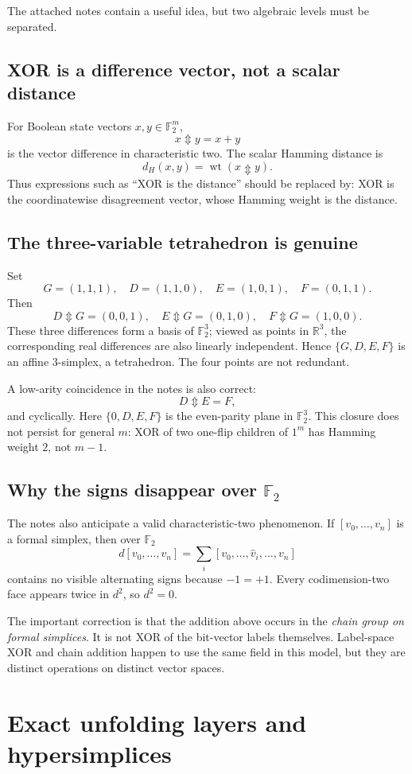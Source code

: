 \documentclass[11pt]{article}
\newcommand{\Ftwo}{\mathbb F_2}
\newcommand{\wt}{\operatorname{wt}}
\newcommand{\Updown}{\mathbin{\Updownarrow}}
\begin{document}
The attached notes contain a useful idea, but two algebraic levels must be separated.

\subsection{XOR is a difference vector, not a scalar distance}
For Boolean state vectors $x,y\in\Ftwo^m$,
\[
x\Updown y=x+y
\]
is the vector difference in characteristic two.  The scalar Hamming distance is
\[
d_H(x,y)=\wt(x\Updown y).
\]
Thus expressions such as ``XOR is the distance'' should be replaced by: XOR is the coordinatewise disagreement vector, whose Hamming weight is the distance.

\subsection{The three-variable tetrahedron is genuine}
Set
\[
G=(1,1,1),\quad D=(1,1,0),\quad E=(1,0,1),\quad F=(0,1,1).
\]
Then
\[
D\Updown G=(0,0,1),\quad E\Updown G=(0,1,0),\quad F\Updown G=(1,0,0).
\]
These three differences form a basis of $\Ftwo^3$; viewed as points in $\mathbb R^3$, the corresponding real differences are also linearly independent.  Hence $\{G,D,E,F\}$ is an affine $3$-simplex, a tetrahedron.  The four points are not redundant.

A low-arity coincidence in the notes is also correct:
\[
D\Updown E=F,
\]
and cyclically.  Here $\{0,D,E,F\}$ is the even-parity plane in $\Ftwo^3$.  This closure does not persist for general $m$: XOR of two one-flip children of $1^m$ has Hamming weight $2$, not $m-1$.

\subsection{Why the signs disappear over $\Ftwo$}
The notes also anticipate a valid characteristic-two phenomenon.  If $[v_0,\dots,v_n]$ is a formal simplex, then over $\Ftwo$
\[
d[v_0,\dots,v_n]
=\sum_i[v_0,\dots,\widehat v_i,\dots,v_n]
\]
contains no visible alternating signs because $-1=+1$.  Every codimension-two face appears twice in $d^2$, so $d^2=0$.

The important correction is that the addition above occurs in the \emph{chain group on formal simplices}.  It is not XOR of the bit-vector labels themselves.  Label-space XOR and chain addition happen to use the same field in this model, but they are distinct operations on distinct vector spaces.

\section{Exact unfolding layers and hypersimplices}
\end{document}
